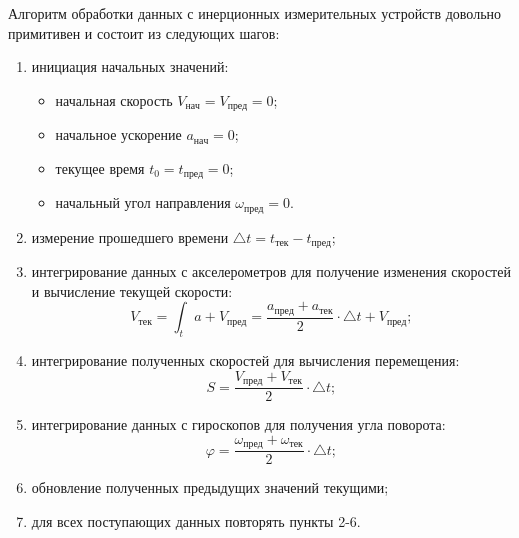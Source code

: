 Алгоритм обработки данных с инерционных измерительных устройств довольно примитивен и состоит из следующих шагов:
\begin{enumerate}
\item инициация начальных значений: 
	\begin{itemize}
	\item начальная скорость $V_{нач} = V_{пред} = 0$;
	\item начальное ускорение $a_{нач} = 0$;
	\item текущее время $t_0=t_{пред}=0$;
	\item начальный угол направления $ \omega_{пред} = 0$.
	\end{itemize}
\item измерение прошедшего времени $\triangle t = t_{тек}-t_{пред}$;
\item интегрирование данных с акселерометров для получение изменения скоростей и вычисление текущей скорости: 
$$V_{тек} = 
\int_t a + V_{пред} =  
\frac{a_{пред} + a_{тек}}{2} \cdot \triangle t + V_{пред};$$
\item интегрирование полученных скоростей для вычисления перемещения:
$$
S = \frac{V_{пред}+ V_{тек}}{2} \cdot \triangle t;
$$
\item интегрирование данных с гироскопов для получения угла поворота:
$$
\varphi = \frac{\omega_{пред}+ \omega_{тек}}{2} \cdot \triangle t;
$$
\item обновление полученных предыдущих значений текущими;
\item для всех поступающих данных повторять пункты 2-6. 
\end{enumerate}

